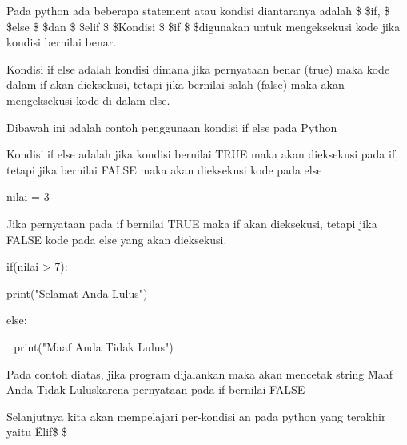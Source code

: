 \vspace{\baselineskip}
 \par
\noindent 
Pada python ada beberapa statement atau kondisi diantaranya adalah \$  \$if, \$  \$else \$  \$dan \$  \$elif \$  \$Kondisi \$  \$if \$  \$digunakan untuk mengeksekusi kode jika kondisi bernilai benar.\vspace{\baselineskip}
\vspace{\baselineskip}
 \par
\noindent 
Kondisi if else adalah kondisi dimana jika pernyataan benar (true) maka kode dalam if akan dieksekusi, tetapi jika bernilai salah (false) maka akan mengeksekusi kode di dalam else.\vspace{\baselineskip}
\vspace{\baselineskip}
 \par
\noindent 
Dibawah ini adalah contoh penggunaan kondisi if else pada Python \par
\vspace{12pt}
\noindent 
Kondisi if else adalah jika kondisi bernilai TRUE maka akan dieksekusi pada if, tetapi jika bernilai FALSE maka akan dieksekusi kode pada else \par
\noindent 
\vspace{\baselineskip}
nilai = 3\vspace{\baselineskip}
 \par
\noindent 
Jika pernyataan pada if bernilai TRUE maka if akan dieksekusi, tetapi jika FALSE kode pada else yang akan dieksekusi.\vspace{\baselineskip}
 \par
\noindent 
if(nilai > 7):\vspace{\baselineskip}
 $  $  $  $ \par
\noindent 
 print("Selamat Anda Lulus")\vspace{\baselineskip}
 \par
\noindent 
else:\vspace{\baselineskip}
 \par
\noindent 
 $  $  $  $ print("Maaf Anda Tidak Lulus") \par
\noindent 
\vspace{\baselineskip}
\vspace{\baselineskip}
Pada contoh diatas, jika program dijalankan maka akan mencetak string \"Maaf Anda Tidak Lulus\" karena pernyataan pada if bernilai FALSE \par
\noindent 
\vspace{\baselineskip}
Selanjutnya kita akan mempelajari per-kondisi an pada python yang terakhir yaitu \"Elif\" \$  \$ \par
